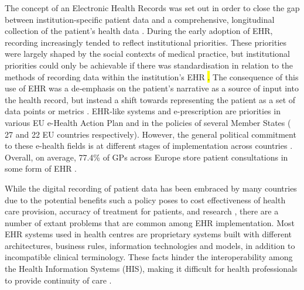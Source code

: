 The concept of an Electronic Health Records was set out in order to close the gap between institution-specific patient data and a comprehensive, longitudinal collection of the patient's health data \cite{quaglio2016health}. During the early adoption of EHR, recording increasingly tended to reflect institutional priorities. These priorities were largely shaped by the social contexts of medical practice, but institutional priorities could only be achievable if there was standardisation in relation to the methods of recording data within the institution's EHR  \cite{doi:10.1111/nup.12112}\hl{.} The consequence of this use of EHR was a de‐emphasis on the patient's narrative as a source of input into the health record, but instead a shift towards representing the patient as a set of data points or metrics \cite{doi:10.1111/nup.12112}. EHR-like systems and e-prescription are priorities in various EU e-Health Action Plan and in the policies of several Member States ( 27 and 22 EU countries respectively). However, the general political commitment to these e-health fields is at different stages of implementation across countries \cite{stroetmann2011european}. Overall, on average, 77.4\% of GPs across Europe store patient consultations in some form of EHR \cite{de2015basic}.

While the digital recording of patient data has been embraced by many countries due to the potential benefits such a policy poses to cost effectiveness of health care provision, accuracy of treatment for patients, and research \cite{peckham2016electronic}, there are a number of extant problems that are common among EHR implementation. Most EHR systems used in health centres are proprietary systems built with different architectures, business rules, information technologies and models, in addition to incompatible clinical terminology. These facts hinder the interoperability among the Health Information Systems (HIS), making it difficult for health professionals to provide continuity of care \cite{gomes2018marcia}.


